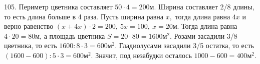 105. Периметр цветника составляет $50\cdot4=200$м. Ширина составляет 2/8 длины, то есть длина больше в 4 раза. Пусть ширина равна $x,$ тогда длина равна $4x$ и верно равенство $(x+4x)\cdot2=200,\ 5x=100,\ x=20$м. Тогда длина равна $4\cdot20=80$м, а площадь цветника $S=20\cdot80=1600\text{м}^2.$ Розами засадили 3/8 цветника, то есть $1600:8\cdot3=600\text{м}^2.$ Гладиолусами засадили 3/5 остатка, то есть $(1600-600):5\cdot3=600\text{м}^2.$ Значит, под незабудки осталось $1000-600=400\text{м}^2.$\\
